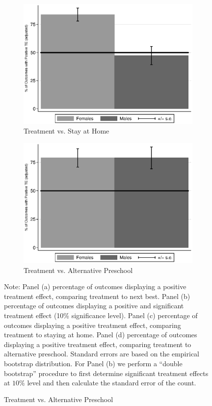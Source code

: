 \begin{figure}
\begin{subfigure}[h]{0.4\textwidth}
		\caption{ Treatment vs. Stay at Home} \label{fig:ppositivehome}
		\includegraphics[width=\textwidth]{output/epan_ipw_p0_all.eps}
\end{subfigure}%
\begin{subfigure}[h]{0.4\textwidth}
	\centering
	\caption{Treatment vs. Alternative Preschool} \label{fig:ppositivealternative}
		\includegraphics[width=\textwidth]{output/epan_ipw_p1_all.eps}
\end{subfigure}
\footnotesize \justify
Note: Panel (a) percentage of outcomes displaying a positive treatment effect, comparing treatment to next best. Panel (b) percentage of outcomes displaying a positive and significant treatment effect (10\% significance level). Panel (c) percentage of outcomes displaying a positive treatment effect, comparing treatment to staying at home. Panel (d) percentage of outcomes displaying a positive treatment effect, comparing treatment to alternative preschool. Standard errors are based on the empirical bootstrap distribution. For Panel (b) we perform a ``double bootstrap'' procedure to first determine significant treatment effects at $10\%$ level and then calculate the standard error of the count.\\
\end{figure}


